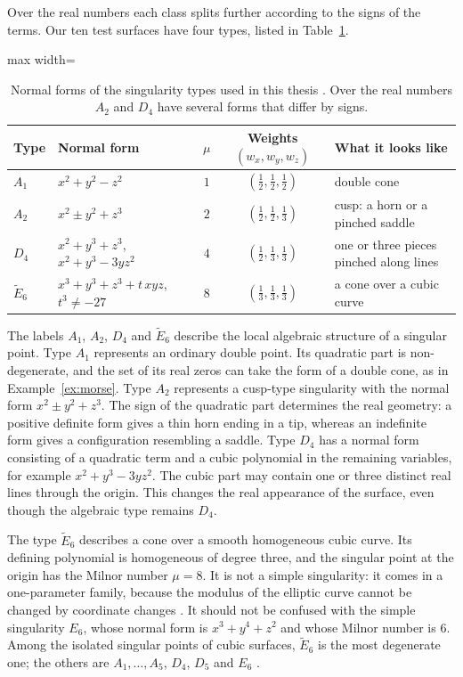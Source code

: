 \documentclass[12pt, a4paper, oneside]{book}
\theoremstyle{plain}
\theoremstyle{definition}
\theoremstyle{remark}
\theoremstyle{definition}
\begin{document}
Over the real numbers each class splits further according to the signs of the terms. Our ten test surfaces have four types, listed in Table~\ref{tab:normal-forms}.

\begin{table}[!h]
\centering
\small
\begin{adjustbox}{max width=\textwidth}
\begin{tabular}{l l c c l}
\toprule
Type & Normal form & $\mu$ & Weights $(w_x,w_y,w_z)$ & What it looks like \\
\midrule
$A_1$ & $x^2+y^2-z^2$ & $1$ & $(\frac12,\frac12,\frac12)$ & double cone \\
$A_2$ & $x^2\pm y^2+z^3$ & $2$ & $(\frac12,\frac12,\frac13)$ & cusp: a horn or a pinched saddle \\
$D_4$ & $x^2+y^3+z^3$, \ $x^2+y^3-3yz^2$ & $4$ & $(\frac12,\frac13,\frac13)$ & one or three pieces pinched along lines \\
$\tilde E_6$ & $x^3+y^3+z^3+t\,xyz$, \ $t^3\neq-27$ & $8$ & $(\frac13,\frac13,\frac13)$ & a cone over a cubic curve \\
\bottomrule
\end{tabular}
\end{adjustbox}
\caption[Normal forms]{Normal forms of the singularity types used in this thesis \cite{arnold1985singularities,arnold2012singularities}. Over the real numbers $A_2$ and $D_4$ have several forms that differ by signs.}
\label{tab:normal-forms}
\end{table}

The labels $A_1$, $A_2$, $D_4$ and $\tilde E_6$ describe the local algebraic structure of a singular point. Type $A_1$ represents an ordinary double point. Its quadratic part is non-degenerate, and the set of its real zeros can take the form of a double cone, as in Example~\ref{ex:morse}. Type $A_2$ represents a cusp-type singularity with the normal form $x^2\pm y^2+z^3$. The sign of the quadratic part determines the real geometry: a positive definite form gives a thin horn ending in a tip, whereas an indefinite form gives a configuration resembling a saddle. Type $D_4$ has a normal form consisting of a quadratic term and a cubic polynomial in the remaining variables, for example $x^2+y^3-3yz^2$. The cubic part may contain one or three distinct real lines through the origin. This changes the real appearance of the surface, even though the algebraic type remains $D_4$.

The type $\tilde E_6$ describes a cone over a smooth homogeneous cubic curve. Its defining polynomial is homogeneous of degree three, and the singular point at the origin has the Milnor number $\mu=8$. It is not a simple singularity: it comes in a one-parameter family, because the modulus of the elliptic curve cannot be changed by coordinate changes \cite{arnold1985singularities}. It should not be confused with the simple singularity $E_6$, whose normal form is $x^3+y^4+z^2$ and whose Milnor number is $6$. Among the isolated singular points of cubic surfaces, $\tilde E_6$ is the most degenerate one; the others are $A_1,\dots,A_5$, $D_4$, $D_5$ and $E_6$ \cite{bruce1979classification}.
\end{document}
